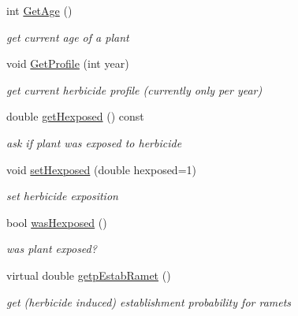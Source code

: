 \begin{DoxyCompactItemize}
\mbox{\label{class_c_t_d_plant_ac93a9be9717f2ceeeb1b53e96139308b}} 
int \mbox{\hyperlink{class_c_t_d_plant_ac93a9be9717f2ceeeb1b53e96139308b}{Get\+Age}} ()
\begin{DoxyCompactList}\small\item\em get current age of a plant \end{DoxyCompactList}\item 
void \mbox{\hyperlink{class_c_t_d_plant_af5806a71c9d946235d4736ea1a5997fb}{Get\+Profile}} (int year)
\begin{DoxyCompactList}\small\item\em get current herbicide profile (currently only per year) \end{DoxyCompactList}\item 
\mbox{\label{class_c_t_d_plant_acf273f4578220cf4f303a0a49b4c2a9d}} 
double \mbox{\hyperlink{class_c_t_d_plant_acf273f4578220cf4f303a0a49b4c2a9d}{get\+Hexposed}} () const
\begin{DoxyCompactList}\small\item\em ask if plant was exposed to herbicide \end{DoxyCompactList}\item 
void \mbox{\hyperlink{class_c_t_d_plant_a5fd5e9ad220621ab462a3cef67bd3206}{set\+Hexposed}} (double hexposed=1)
\begin{DoxyCompactList}\small\item\em set herbicide exposition \end{DoxyCompactList}\item 
\mbox{\label{class_c_t_d_plant_a6b6ba874ab8a0bf643dc296935a28f2a}} 
bool \mbox{\hyperlink{class_c_t_d_plant_a6b6ba874ab8a0bf643dc296935a28f2a}{was\+Hexposed}} ()
\begin{DoxyCompactList}\small\item\em was plant exposed? \end{DoxyCompactList}\item 
virtual double \mbox{\hyperlink{class_c_t_d_plant_a19bab3a7643e23e1bdbf1f3b9a5fdf8b}{getp\+Estab\+Ramet}} ()
\begin{DoxyCompactList}\small\item\em get (herbicide induced) establishment probability for ramets \end{DoxyCompactList}\end{DoxyCompactItemize}
